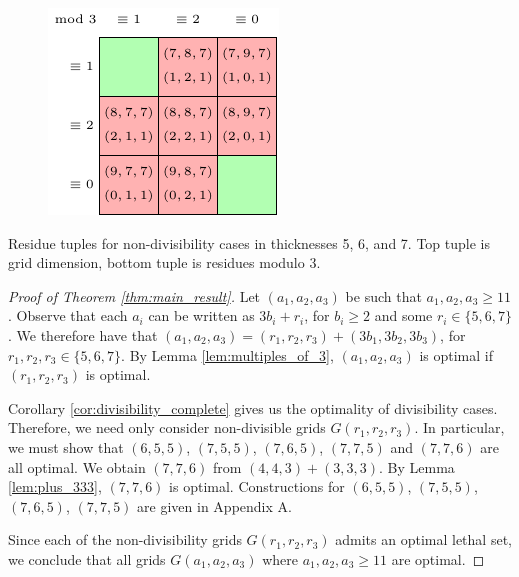 \begin{table}[]
\begin{subfigure}{0.3\textwidth}
	\label{tab:r_b}
\end{subfigure} \hfill%
\begin{subfigure}{0.3\textwidth}
	\includegraphics[width=\textwidth]{tables/4/residue_1.pdf}
	\label{tab:r_c}
\end{subfigure}
\caption{Residue tuples for non-divisibility cases in thicknesses 5, 6, and 7. Top tuple is grid dimension, bottom tuple is residues modulo 3.}
\label{tab:residues}
\end{table} 

\begin{proof}[Proof of Theorem \ref{thm:main_result}]
Let $(a_1,a_2,a_3)$ be such that $a_1, a_2, a_3 \geq 11$. Observe that each $a_i$ can be written as $3b_i + r_i$, for $b_i \geq 2$ and some $r_i \in \{5,6,7\}$. We therefore have that $(a_1,a_2,a_3) = (r_1,r_2,r_3) + (3b_1,3b_2,3b_3)$, for $r_1,r_2,r_3 \in \{5,6,7\}$. By Lemma \ref{lem:multiples_of_3}, $(a_1,a_2,a_3)$ is optimal if $(r_1,r_2,r_3)$ is optimal. 

Corollary \ref{cor:divisibility_complete} gives us the optimality of divisibility cases. Therefore, we need only consider non-divisible grids $G(r_1,r_2,r_3)$. In particular, we must show that $(6,5,5)$, $(7,5,5)$, $(7,6,5)$, $(7,7,5)$ and $(7,7,6)$ are all optimal. We obtain $(7,7,6)$ from $(4,4,3) + (3,3,3)$. By Lemma \ref{lem:plus_333}, $(7,7,6)$ is optimal. Constructions for $(6,5,5)$, $(7,5,5)$, $(7,6,5)$, $(7,7,5)$ are given in Appendix A.

Since each of the non-divisibility grids $G(r_1,r_2,r_3)$ admits an optimal lethal set, we conclude that all grids $G(a_1,a_2,a_3)$ where $a_1, a_2, a_3 \geq 11$ are optimal.
\end{proof}

